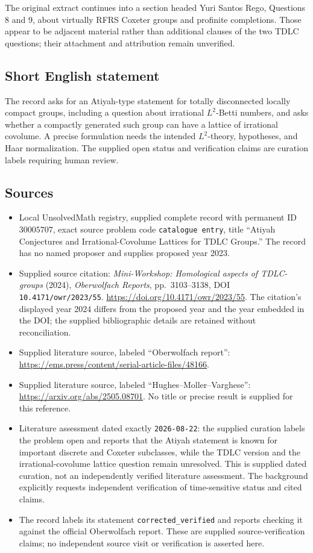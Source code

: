 \documentclass[11pt]{article}
\begin{document}
The original extract continues into a section headed Yuri Santos Rego, Questions 8 and 9, about virtually RFRS Coxeter groups and profinite completions. Those appear to be adjacent material rather than additional clauses of the two TDLC questions; their attachment and attribution remain unverified.
\subsection{Short English statement}
The record asks for an Atiyah-type statement for totally disconnected locally compact groups, including a question about irrational \(L^2\)-Betti numbers, and asks whether a compactly generated such group can have a lattice of irrational covolume. A precise formulation needs the intended \(L^2\)-theory, hypotheses, and Haar normalization. The supplied open status and verification claims are curation labels requiring human review.
\subsection{Sources}
\begin{itemize}
\item Local UnsolvedMath registry, supplied complete record with permanent ID \(30005707\), exact source problem code \texttt{catalogue entry}, title ``Atiyah Conjectures and Irrational-Covolume Lattices for TDLC Groups.'' The record has no named proposer and supplies proposed year 2023.
\item Supplied source citation: \emph{Mini-Workshop: Homological aspects of TDLC-groups} (2024), \emph{Oberwolfach Reports}, pp.\ 3103--3138, DOI \texttt{10.4171/owr/2023/55}. \url{https://doi.org/10.4171/owr/2023/55}. The citation's displayed year 2024 differs from the proposed year and the year embedded in the DOI; the supplied bibliographic details are retained without reconciliation.
\item Supplied literature source, labeled ``Oberwolfach report'': \url{https://ems.press/content/serial-article-files/48166}.
\item Supplied literature source, labeled ``Hughes--Moller--Varghese'': \url{https://arxiv.org/abs/2505.08701}. No title or precise result is supplied for this reference.
\item Literature assessment dated exactly \texttt{2026-08-22}: the supplied curation labels the problem open and reports that the Atiyah statement is known for important discrete and Coxeter subclasses, while the TDLC version and the irrational-covolume lattice question remain unresolved. This is supplied dated curation, not an independently verified literature assessment. The background explicitly requests independent verification of time-sensitive status and cited claims.
\item The record labels its statement \texttt{corrected\_verified} and reports checking it against the official Oberwolfach report. These are supplied source-verification claims; no independent source visit or verification is asserted here.
\end{itemize}
\end{document}
